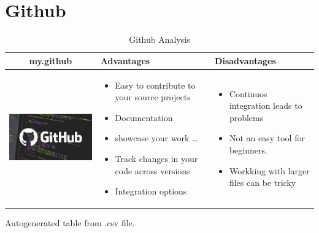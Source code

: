 \documentclass{article}
\begin{document}
	\section{Github}
	\begin{table}[h!]
		\centering
		\begin{tabular}{| c | m{5cm} | m{5cm} | }
			\hline
			my.github & Advantages & Disadvantages \\ \hline
			\begin{minipage}{.4\textwidth}
				\includegraphics[width=\linewidth, height=40mm]{Github}
			\end{minipage}
		&
		\begin{itemize}
			\item Easy to contribute to your source projects
			\item Documentation
			\item showcase your work \ldots
			\item Track changes in your code across versions
			\item Integration options
		\end{itemize}
	&
		\begin{itemize}
			\item Continuos integration leads to problems
			\item Not an easy tool for beginners.
			\item Workking with larger files can be tricky
		\end{itemize}
	\\ \hline
	\end{tabular}
\caption{Github Analysis}\label{tbl:mygithub}
	\end{table}
\newpage
\begin{table}[h!]
	\begin{center}
		\caption{Autogenerated table from .csv file.}
		\label{table1}
	\end{center}
\end{table}
\end{document}
